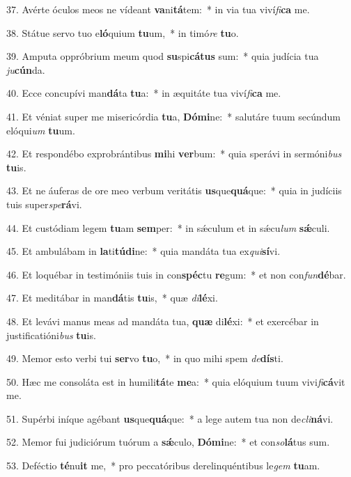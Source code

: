 37. Avérte óculos meos ne vídeant \textbf{va}ni\textbf{tá}tem:~*  in via tua viví\textit{fi}\textbf{ca} me.\

38. Státue servo tuo e\textbf{ló}quium \textbf{tu}um,~*  in timó\textit{re} \textbf{tu}o.\

39. Amputa oppróbrium meum quod \textbf{su}spi\textbf{cá}\textbf{tus} sum:~*  quia judícia tua \textit{ju}\textbf{cún}da.\

40. Ecce concupívi man\textbf{dá}ta \textbf{tu}a:~*  in æquitáte tua viví\textit{fi}\textbf{ca} me.\

41. Et véniat super me misericórdia \textbf{tu}a, \textbf{Dó}\textbf{mi}ne:~*  salutáre tuum secúndum elóqui\textit{um} \textbf{tu}um.\

42. Et respondébo exprobrántibus \textbf{mi}hi \textbf{ver}bum:~*  quia sperávi in sermóni\textit{bus} \textbf{tu}is.\

43. Et ne áuferas de ore meo verbum veritátis \textbf{us}que\textbf{quá}que:~*  quia in judíciis tuis super\textit{spe}\textbf{rá}vi.\

44. Et custódiam legem \textbf{tu}am \textbf{sem}per:~*  in sǽculum et in sǽcu\textit{lum} \textbf{sǽ}culi.\

45. Et ambulábam in \textbf{la}ti\textbf{tú}\textbf{di}ne:~*  quia mandáta tua ex\textit{qui}\textbf{sí}vi.\

46. Et loquébar in testimóniis tuis in con\textbf{spéc}tu \textbf{re}gum:~*  et non con\textit{fun}\textbf{dé}bar.\

47. Et meditábar in man\textbf{dá}tis \textbf{tu}is,~*  quæ \textit{di}\textbf{lé}xi.\

48. Et levávi manus meas ad mandáta tua, \textbf{quæ} di\textbf{lé}xi:~*  et exercébar in justificatióni\textit{bus} \textbf{tu}is.\

49. Memor esto verbi tui \textbf{ser}vo \textbf{tu}o,~*  in quo mihi spem \textit{de}\textbf{dís}ti.\

50. Hæc me consoláta est in humili\textbf{tá}te \textbf{me}a:~*  quia elóquium tuum vivi\textit{fi}\textbf{cá}vit me.\

51. Supérbi iníque agébant \textbf{us}que\textbf{quá}que:~*  a lege autem tua non de\textit{cli}\textbf{ná}vi.\

52. Memor fui judiciórum tuórum a \textbf{sǽ}culo, \textbf{Dó}\textbf{mi}ne:~*  et con\textit{so}\textbf{lá}tus sum.\

53. Deféctio \textbf{té}nu\textbf{it} me,~*  pro peccatóribus derelinquéntibus le\textit{gem} \textbf{tu}am.\

